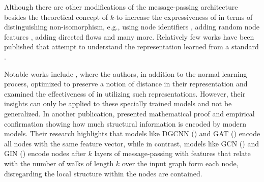 Although there are other modifications of the message-passing architecture besides the theoretical concept of $k$-\gnn to increase the expressiveness of \gnns in terms of distinguishing non-isomorphism, e.g., using node identifiers \cite{Vignac2020}, adding random node features \cite{Sato2021,Abboud2020}, adding directed flows \cite{Beaini2021} and many more. Relatively few works have been published that attempt to understand the representation learned from a standard \gnn.

Notable works include \cite{Nikolentzos2023weisfeiler}, where the authors, in addition to the normal learning process, optimized \gnns to preserve a notion of distance in their representation and examined the effectiveness of \gnns in utilizing such representations. However, their insights can only be applied to these specially trained \gnn models and not be generalized. In another publication, \cite{Nikolentzos2023} presented mathematical proof and empirical confirmation showing how much structural information is encoded by modern \gnn models. Their research highlights that \gnn models like DGCNN (\cite{Zhang2018}) and GAT (\cite{Velivckovic2017}) encode all nodes with the same feature vector, while in contrast, models like GCN (\cite{Kip+2017}) and GIN (\cite{Xu2018}) encode nodes after $k$ layers of message-passing with features that relate with the number of walks of length $k$ over the input graph form each node, disregarding the local structure within the nodes are contained.